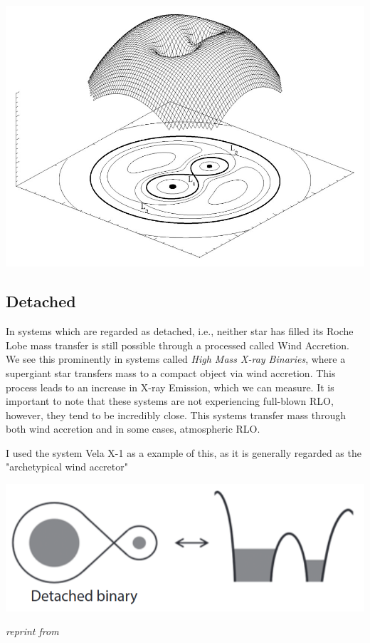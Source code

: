 \documentclass[12pt, letterpaper]{article}
\begin{document}
    \includegraphics[width=\textwidth]{Figs/RochePotential.jpg}

        \subsection{\centering Detached}
        In systems which are regarded as detached, i.e., neither star has filled its Roche Lobe mass transfer is still possible through a processed called Wind Accretion. We see this prominently in systems called \textit{High Mass X-ray Binaries}, where a supergiant star transfers mass to a compact object via wind accretion. This process leads to an increase in X-ray Emission, which we can measure.  \cite{TaurisvandenHeuvel+2023} It is important to note that these systems are not experiencing full-blown RLO, however, they tend to be incredibly close. \cite{TaurisvandenHeuvel+2023} This systems transfer mass through both wind accretion and in some cases, atmospheric RLO.

        I used the system Vela X-1 \cite{Kretschmar_2021} as a example of this, as it is generally regarded as the "archetypical wind accretor" \cite{Kretschmar_2021} 
        
        \begin{center}
            \includegraphics[scale = .4]{Figs/Detached binary.png}

            \textit{reprint from \cite{TaurisvandenHeuvel+2023}}
        \end{center}
        
\end{document}
